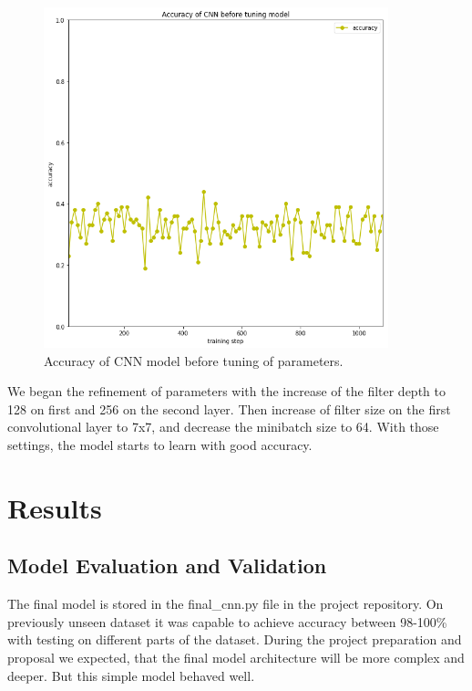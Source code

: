 \documentclass{article}
\begin{document}
\begin{figure}[!htp]
\centerline{\includegraphics[width=10cm]{img/initial_model_accuracy.png}}
\renewcommand{\figurename}{Figure}
\caption[Accuracy of CNN model before tuning of parameters.]{Accuracy of CNN model before tuning of parameters.}
\label{fig:InitialModelAccuracy}
\end{figure}



We began the refinement of parameters with the increase of the filter
depth to 128 on first and 256 on the second layer. Then increase of
filter size on the first convolutional layer to 7x7, and decrease the
minibatch size to 64. With those settings, the model starts to learn
with good accuracy.

\section{Results}\label{results}

\subsection{Model Evaluation and
Validation}\label{model-evaluation-and-validation}

The final model is stored in the final\_cnn.py file in the project
repository. On previously unseen dataset it was capable to achieve
accuracy between 98-100\% with testing on different parts of the
dataset. During the project preparation and proposal we expected, that
the final model architecture will be more complex and deeper. But this
simple model behaved well.
\end{document}
